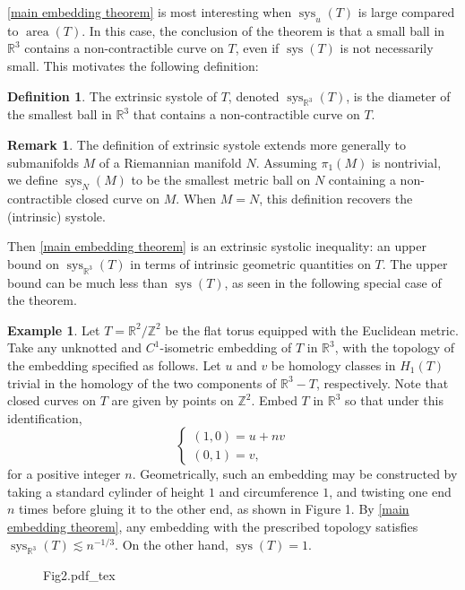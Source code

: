 \documentclass[12pt]{amsart}
\DeclareMathOperator*{\Area}{area}
\DeclareMathOperator*{\sys}{sys}
\theoremstyle{definition}
\newtheorem{definition}[theorem]{Definition}
\newtheorem{remark}[theorem]{Remark}
\newtheorem{example}[theorem]{Example}
\begin{document}
\cref{main embedding theorem} is most interesting when $\sys_u(T)$ is large compared to $\Area(T)$. In this case, the conclusion of the theorem is that a small ball in $\mathbb{R}^3$ contains a non-contractible curve on $T$, even if $\sys(T)$ is not necessarily small. This motivates the following definition:

\begin{definition} The extrinsic systole of $T$, denoted $\sys_{\mathbb{R}^3}(T)$, is the diameter of the smallest ball in $\mathbb{R}^3$ that contains a non-contractible curve on $T$.
\end{definition}

\begin{remark} The definition of extrinsic systole extends more generally to submanifolds $M$ of a Riemannian manifold $N$. Assuming $\pi_1(M)$ is nontrivial, we define $\sys_N(M)$ to be the smallest metric ball on $N$ containing a non-contractible closed curve on $M$. When $M=N$, this definition recovers the (intrinsic) systole. 
\end{remark}

Then \cref{main embedding theorem} is an extrinsic systolic inequality: an upper bound on $\sys_{\mathbb{R}^3}(T)$ in terms of intrinsic geometric quantities on $T$. The upper bound can be much less than $\sys(T)$, as seen in the following special case of the theorem.

\begin{example} \label{twisted cylinder}
Let $T=\mathbb{R}^2/\mathbb{Z}^2$ be the flat torus equipped with the Euclidean metric. Take any unknotted and $C^1$-isometric embedding of $T$ in $\mathbb{R}^3$, with the topology of the embedding specified as follows. Let $u$ and $v$ be homology classes in $H_1(T)$ trivial in the homology of the two components of $\mathbb{R}^3-T$, respectively. Note that closed curves on $T$ are given by points on $\mathbb{Z}^2$. Embed $T$ in $\mathbb{R}^3$ so that under this identification, 
\begin{equation*}
\begin{cases} (1,0)=u+nv\\
(0,1)=v,
\end{cases}
\end{equation*} for a positive integer $n$. Geometrically, such an embedding may be constructed by taking a standard cylinder of height $1$ and circumference $1$, and twisting one end $n$ times before gluing it to the other end, as shown in Figure 1. By \cref{main embedding theorem}, any embedding with the prescribed topology satisfies $\sys_{\mathbb{R}^3}(T)\lesssim n^{-1/3}$. On the other hand, $\sys(T)=1$.

\begin{figure}[h]
{Fig2.pdf_tex}
\caption{}
\end{figure}
\end{example}
\end{document}
